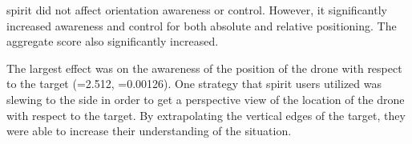   \gls{spirit} did not affect orientation awareness or control.
  However, it significantly increased awareness and control for both absolute and relative positioning.
  The aggregate score also significantly increased.

  The largest effect was on the awareness of the position of the drone with respect to the target (=2.512, =0.00126).
  One strategy that \gls{spirit} users utilized was slewing to the side in order to get a perspective view of the location of the drone with respect to the target.
  By extrapolating the vertical edges of the target, they were able to increase their understanding of the situation.
